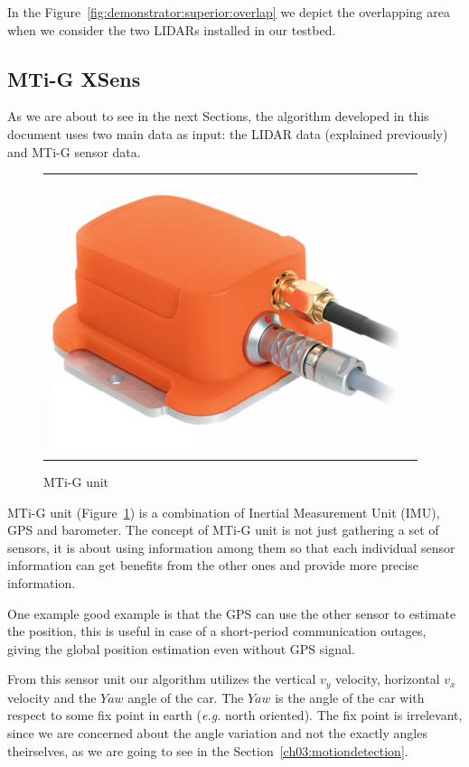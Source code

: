 In the Figure~\ref{fig:demonstrator:superior:overlap} we depict the overlapping area when we consider the two LIDARs installed in our testbed.

\subsection{MTi-G XSens}

As we are about to see in the next Sections, the algorithm developed in this document uses two main data as input: the LIDAR data (explained previously) and MTi-G sensor data.

\begin{figure}[H]
   \centering
     \begin{tabular}{lr}
       \includegraphics[scale=0.3]{img/mti-g}
     \end{tabular}
   \caption{MTi-G unit}
   \label{fig:xsens:mtig}
 \end{figure}

MTi-G unit (Figure~\ref{fig:xsens:mtig}) is a combination of Inertial Measurement Unit (IMU), GPS and barometer. The concept of MTi-G unit is not just gathering a set of sensors, it is about using information among them so that each individual sensor information can get benefits from the other ones and provide more precise information.

One example good example is that the GPS can use the other sensor to estimate the position, this is useful in case of a short-period communication outages, giving the global position estimation even without GPS signal. 

From this sensor unit our algorithm utilizes the vertical $v_y$ velocity, horizontal $v_x$ velocity and the $Yaw$ angle of the car. The $Yaw$ is the angle of the car with respect to some fix point in earth (\textit{e.g.} north oriented). The fix point is irrelevant, since we are concerned about the angle variation and not the exactly angles theirselves, as we are going to see in the Section~\ref{ch03:motiondetection}.


